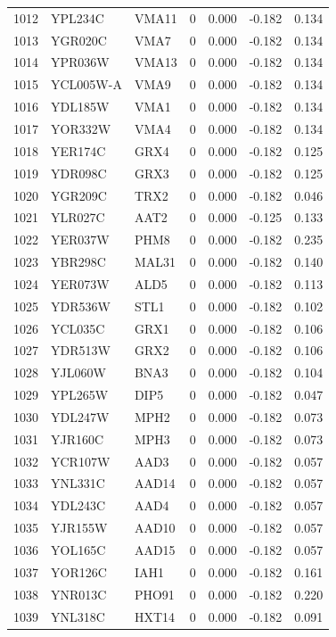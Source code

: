 \begin{longtable}{rllrrrr}
1012 & YPL234C & VMA11 & 0 & 0.000 & -0.182 & 0.134\\
1013 & YGR020C & VMA7 & 0 & 0.000 & -0.182 & 0.134\\
1014 & YPR036W & VMA13 & 0 & 0.000 & -0.182 & 0.134\\
1015 & YCL005W-A & VMA9 & 0 & 0.000 & -0.182 & 0.134\\
1016 & YDL185W & VMA1 & 0 & 0.000 & -0.182 & 0.134\\
1017 & YOR332W & VMA4 & 0 & 0.000 & -0.182 & 0.134\\
1018 & YER174C & GRX4 & 0 & 0.000 & -0.182 & 0.125\\
1019 & YDR098C & GRX3 & 0 & 0.000 & -0.182 & 0.125\\
1020 & YGR209C & TRX2 & 0 & 0.000 & -0.182 & 0.046\\
1021 & YLR027C & AAT2 & 0 & 0.000 & -0.125 & 0.133\\
1022 & YER037W & PHM8 & 0 & 0.000 & -0.182 & 0.235\\
1023 & YBR298C & MAL31 & 0 & 0.000 & -0.182 & 0.140\\
1024 & YER073W & ALD5 & 0 & 0.000 & -0.182 & 0.113\\
1025 & YDR536W & STL1 & 0 & 0.000 & -0.182 & 0.102\\
1026 & YCL035C & GRX1 & 0 & 0.000 & -0.182 & 0.106\\
1027 & YDR513W & GRX2 & 0 & 0.000 & -0.182 & 0.106\\
1028 & YJL060W & BNA3 & 0 & 0.000 & -0.182 & 0.104\\
1029 & YPL265W & DIP5 & 0 & 0.000 & -0.182 & 0.047\\
1030 & YDL247W & MPH2 & 0 & 0.000 & -0.182 & 0.073\\
1031 & YJR160C & MPH3 & 0 & 0.000 & -0.182 & 0.073\\
1032 & YCR107W & AAD3 & 0 & 0.000 & -0.182 & 0.057\\
1033 & YNL331C & AAD14 & 0 & 0.000 & -0.182 & 0.057\\
1034 & YDL243C & AAD4 & 0 & 0.000 & -0.182 & 0.057\\
1035 & YJR155W & AAD10 & 0 & 0.000 & -0.182 & 0.057\\
1036 & YOL165C & AAD15 & 0 & 0.000 & -0.182 & 0.057\\
1037 & YOR126C & IAH1 & 0 & 0.000 & -0.182 & 0.161\\
1038 & YNR013C & PHO91 & 0 & 0.000 & -0.182 & 0.220\\
1039 & YNL318C & HXT14 & 0 & 0.000 & -0.182 & 0.091\\

\end{longtable}
